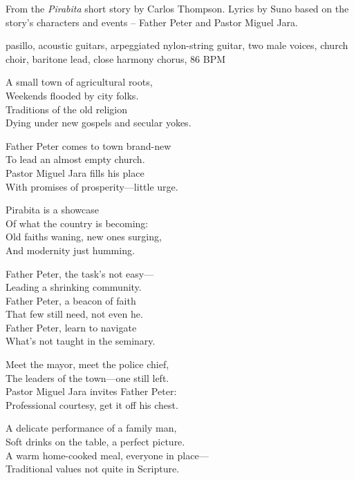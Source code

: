 
\label{sec:pirabita-view}
\begin{notes}
From the \emph{Pirabita} short story by Carlos Thompson. Lyrics by Suno based on the story's characters and events -- Father Peter and Pastor Miguel Jara.
\end{notes}
\begin{style}
pasillo, acoustic guitars, arpeggiated nylon-string guitar, two male voices, church choir, baritone lead, close harmony chorus, 86 BPM
\end{style}
\begin{lyrics}
A small town of agricultural roots,\\
Weekends flooded by city folks.\\
Traditions of the old religion\\
Dying under new gospels and secular yokes.

Father Peter comes to town brand-new\\
To lead an almost empty church.\\
Pastor Miguel Jara fills his place\\
With promises of prosperity—little urge.

Pirabita is a showcase\\
Of what the country is becoming:\\
Old faiths waning, new ones surging,\\
And modernity just humming.

Father Peter, the task’s not easy—\\
Leading a shrinking community.\\
Father Peter, a beacon of faith\\
That few still need, not even he.\\
Father Peter, learn to navigate\\
What’s not taught in the seminary.

Meet the mayor, meet the police chief,\\
The leaders of the town—one still left.\\
Pastor Miguel Jara invites Father Peter:\\
Professional courtesy, get it off his chest.

A delicate performance of a family man,\\
Soft drinks on the table, a perfect picture.\\
A warm home-cooked meal, everyone in place—\\
Traditional values not quite in Scripture.


\end{lyrics}
